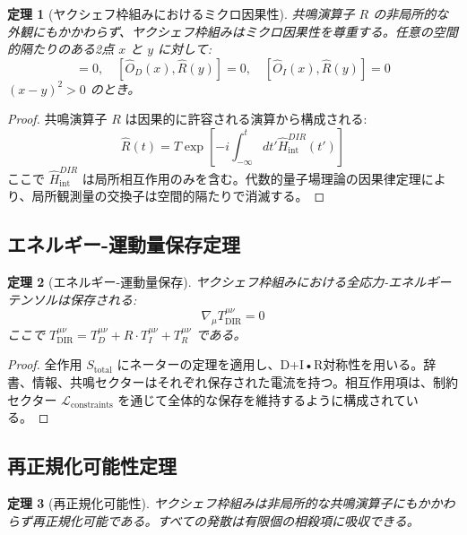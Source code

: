 \documentclass[11pt,a4paper]{article}
\newtheorem{theorem}{定理}
\begin{document}
	\begin{theorem}[ヤクシェフ枠組みにおけるミクロ因果性]
		共鳴演算子 $R$ の非局所的な外観にもかかわらず、ヤクシェフ枠組みはミクロ因果性を尊重する。任意の空間的隔たりのある2点 $x$ と $y$ に対して:
		\begin{equation}
			[\hat{O}_D(x), \hat{O}_I(y)] = 0, \quad [\hat{O}_D(x), \hat{R}(y)] = 0, \quad [\hat{O}_I(x), \hat{R}(y)] = 0
		\end{equation}
		$(x-y)^2 > 0$ のとき。
	\end{theorem}
	
	\begin{proof}
		共鳴演算子 $R$ は因果的に許容される演算から構成される:
		\begin{equation}
			\hat{R}(t) = T \exp\left[ -i \int_{-\infty}^t dt' \hat{H}_{\text{int}}^{DIR}(t') \right]
		\end{equation}
		ここで $\hat{H}_{\text{int}}^{DIR}$ は局所相互作用のみを含む。代数的量子場理論の因果律定理により、局所観測量の交換子は空間的隔たりで消滅する。
	\end{proof}
	
	\subsection{エネルギー-運動量保存定理}
	
	\begin{theorem}[エネルギー-運動量保存]
		ヤクシェフ枠組みにおける全応力-エネルギーテンソルは保存される:
		\begin{equation}
			\boxed{\nabla_\mu T^{\mu\nu}_{\text{DIR}} = 0}
		\end{equation}
		ここで $T^{\mu\nu}_{\text{DIR}} = T^{\mu\nu}_D + R \cdot T^{\mu\nu}_I + T^{\mu\nu}_R$ である。
	\end{theorem}
	
	\begin{proof}
		全作用 $S_{\text{total}}$ にネーターの定理を適用し、D+I•R対称性を用いる。辞書、情報、共鳴セクターはそれぞれ保存された電流を持つ。相互作用項は、制約セクター $\mathcal{L}_{\text{constraints}}$ を通じて全体的な保存を維持するように構成されている。
	\end{proof}
	
	\subsection{再正規化可能性定理}
	
	\begin{theorem}[再正規化可能性]
		ヤクシェフ枠組みは非局所的な共鳴演算子にもかかわらず再正規化可能である。すべての発散は有限個の相殺項に吸収できる。
	\end{theorem}
	
\end{document}
